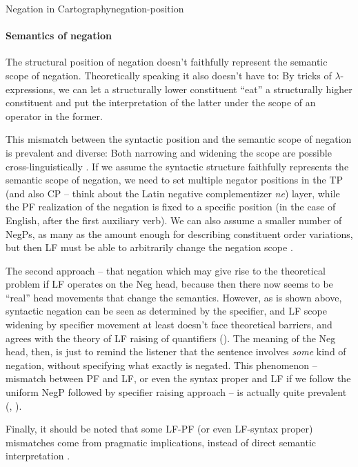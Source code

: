 \documentclass[UTF8, a4paper, oneside, scheme=plain]{ctexrep}
\newcommand*{\citepage}[1]{pp.~{#1}}
\newcommand{\corpus}[1]{\emph{#1}}
\begin{document}
\begin{theorybox}{Negation in Cartography}{negation-position}
    \paragraph*{Semantics of negation} 
    The structural position of negation 
    doesn't faithfully represent the semantic scope of negation.
    Theoretically speaking it also doesn't have to:
    By tricks of $\lambda$-expressions,
    we can let a structurally lower constituent 
    ``eat'' a structurally higher constituent
    and put the interpretation of the latter 
    under the scope of an operator in the former.

    This mismatch between the syntactic position and the semantic scope of negation 
    is prevalent and diverse: 
    Both narrowing and widening the scope are possible cross-linguistically
    \cite[\citepage{40}]{moscati2010negation}.
    If we assume the syntactic structure faithfully 
    represents the semantic scope of negation,
    we need to set multiple negator positions in the TP 
    (and also CP -- think about the Latin negative complementizer \corpus{ne})
    layer, while the PF realization of the negation is fixed to a specific position 
    (in the case of English, after the first auxiliary verb).
    We can also assume a smaller number of NegPs,
    as many as the amount enough for describing constituent order variations,
    but then LF must be able to arbitrarily change the negation scope \citep{moscati2012cartography}.

    The second approach -- that negation 
    which may give rise to the theoretical problem 
    if LF operates on the Neg head,
    because then there now seems to be ``real'' head movements that change the semantics.
    However, as is shown above, syntactic negation can be seen as determined by the specifier,
    and LF scope widening by specifier movement at least doesn't face theoretical barriers,
    and agrees with the theory of LF raising of quantifiers ().
    The meaning of the Neg head, then,
    is just to remind the listener that the sentence involves \emph{some} kind of negation,
    without specifying what exactly is negated.
    This phenomenon -- mismatch between PF and LF, 
    or even the syntax proper and LF 
    if we follow the uniform NegP followed by specifier raising approach --
    is actually quite prevalent (, ).

    Finally, it should be noted that some LF-PF (or even LF-syntax proper) mismatches 
    come from pragmatic implications, 
    instead of direct semantic interpretation
    \citep{zeijlstra2018does,crowley2019neg}.
\end{theorybox}
\end{document}
